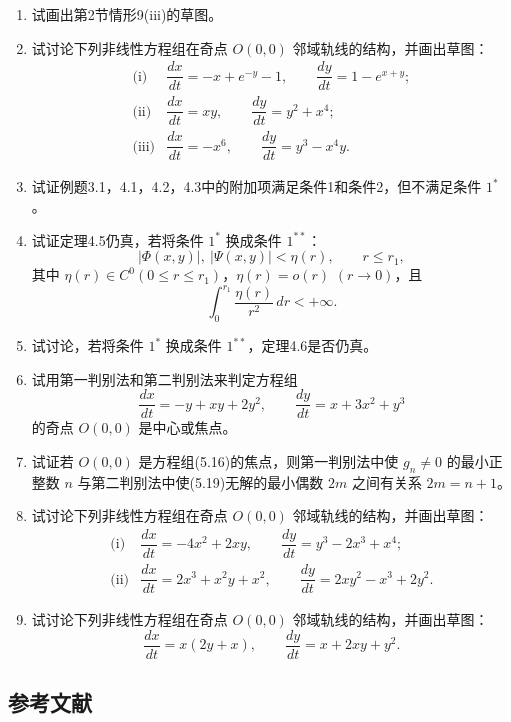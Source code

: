 \begin{enumerate}
\item 试画出第2节情形9(iii)的草图。
\item 试讨论下列非线性方程组在奇点 $O(0,0)$ 邻域轨线的结构，并画出草图：
\[
\begin{array}{ll}
\text{(i)}&
\dfrac{dx}{dt}=-x+e^{-y}-1,\qquad
\dfrac{dy}{dt}=1-e^{x+y};\\[4pt]
\text{(ii)}&
\dfrac{dx}{dt}=xy,\qquad
\dfrac{dy}{dt}=y^2+x^4;\\[4pt]
\text{(iii)}&
\dfrac{dx}{dt}=-x^6,\qquad
\dfrac{dy}{dt}=y^3-x^4y.
\end{array}
\]
\item 试证例题3.1，4.1，4.2，4.3中的附加项满足条件1和条件2，但不满足条件 $1^\ast$。
\item 试证定理4.5仍真，若将条件 $1^\ast$ 换成条件 $1^{\ast\ast}$：
\[
|\Phi(x,y)|,\ |\Psi(x,y)|<\eta(r),\qquad r\le r_1,
\]
其中 $\eta(r)\in C^0(0\le r\le r_1)$，$\eta(r)=o(r)$ $(r\to0)$，且
\[
\int_0^{r_1}\dfrac{\eta(r)}{r^2}\,dr<+\infty.
\]
\item 试讨论，若将条件 $1^\ast$ 换成条件 $1^{\ast\ast}$，定理4.6是否仍真。
\item 试用第一判别法和第二判别法来判定方程组
\[
\dfrac{dx}{dt}=-y+xy+2y^2,\qquad
\dfrac{dy}{dt}=x+3x^2+y^3
\]
的奇点 $O(0,0)$ 是中心或焦点。
\item 试证若 $O(0,0)$ 是方程组(5.16)的焦点，则第一判别法中使 $g_n\ne0$ 的最小正整数 $n$ 与第二判别法中使(5.19)无解的最小偶数 $2m$ 之间有关系 $2m=n+1$。
\item 试讨论下列非线性方程组在奇点 $O(0,0)$ 邻域轨线的结构，并画出草图：
\[
\begin{array}{ll}
\text{(i)}&
\dfrac{dx}{dt}=-4x^2+2xy,\qquad
\dfrac{dy}{dt}=y^3-2x^3+x^4;\\[4pt]
\text{(ii)}&
\dfrac{dx}{dt}=2x^3+x^2y+x^2,\qquad
\dfrac{dy}{dt}=2xy^2-x^3+2y^2.
\end{array}
\]
\item 试讨论下列非线性方程组在奇点 $O(0,0)$ 邻域轨线的结构，并画出草图：
\[
\dfrac{dx}{dt}=x(2y+x),\qquad
\dfrac{dy}{dt}=x+2xy+y^2.
\]
\end{enumerate}

\subsection*{参考文献}

